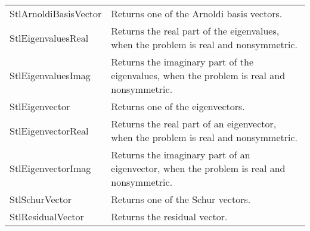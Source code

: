 \begin{tabularx}{\textwidth}{LX}
	StlArnoldiBasisVector & Returns one of the Arnoldi basis vectors.\\
	StlEigenvaluesReal & Returns the real part of the eigenvalues, when the problem is real and nonsymmetric.\\
	StlEigenvaluesImag & Returns the imaginary part of the eigenvalues, when the problem is real and nonsymmetric.\\
	StlEigenvector & Returns one of the eigenvectors.\\
	StlEigenvectorReal & Returns the real part of an eigenvector, when the problem is real and nonsymmetric.\\
	StlEigenvectorImag & Returns the imaginary part of an eigenvector, when the problem is real and nonsymmetric.\\
	StlSchurVector & Returns one of the Schur vectors.\\
	StlResidualVector & Returns the residual vector.\\
\end{tabularx}
